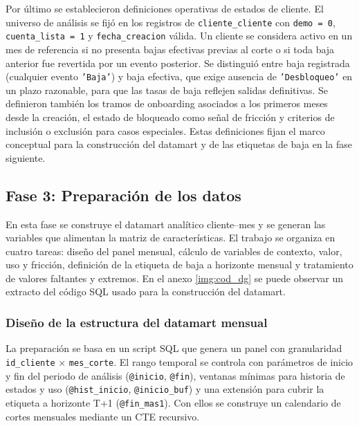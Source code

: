 Por último se establecieron definiciones operativas de estados de cliente. El universo de análisis se fijó en los registros de \texttt{cliente\_\hspace{0pt}cliente} con \texttt{demo = 0}, \texttt{cuenta\_\hspace{0pt}lista = 1} y \texttt{fecha\_\hspace{0pt}creacion} válida. Un cliente se considera activo en un mes de referencia si no presenta bajas efectivas previas al corte o si toda baja anterior fue revertida por un evento posterior. Se distinguió entre baja registrada (cualquier evento \texttt{'Baja'}) y baja efectiva, que exige ausencia de \texttt{'Desbloqueo'} en un plazo razonable, para que las tasas de baja reflejen salidas definitivas. Se definieron también los tramos de onboarding asociados a los primeros meses desde la creación, el estado de bloqueado como señal de fricción y criterios de inclusión o exclusión para casos especiales. Estas definiciones fijan el marco conceptual para la construcción del datamart y de las etiquetas de baja en la fase siguiente.


\subsection{Fase 3: Preparación de los datos}

En esta fase se construye el datamart analítico cliente–mes y se generan las variables que alimentan la matriz de características. El trabajo se organiza en cuatro tareas: diseño del panel mensual, cálculo de variables de contexto, valor, uso y fricción, definición de la etiqueta de baja a horizonte mensual y tratamiento de valores faltantes y extremos. En el anexo \ref{img:cod_dg} se puede observar un extracto del código SQL usado para la construcción del datamart.

\subsubsection{Diseño de la estructura del datamart mensual}

La preparación se basa en un script SQL que genera un panel con granularidad \texttt{id\_\hspace{0pt}cliente} × \texttt{mes\_\hspace{0pt}corte}. El rango temporal se controla con parámetros de inicio y fin del periodo de análisis (\texttt{@inicio}, \texttt{@fin}), ventanas mínimas para historia de estados y uso (\texttt{@hist\_\hspace{0pt}inicio}, \texttt{@inicio\_\hspace{0pt}buf}) y una extensión para cubrir la etiqueta a horizonte T+1 (\texttt{@fin\_\hspace{0pt}mas1}). Con ellos se construye un calendario de cortes mensuales mediante un CTE recursivo.

